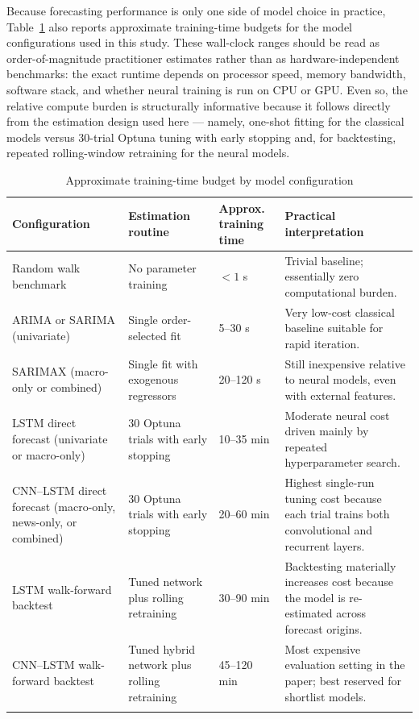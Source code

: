 \documentclass[pdflatex,sn-mathphys-num]{sn-jnl}%
\theoremstyle{thmstyleone}%
\theoremstyle{thmstyletwo}%
\theoremstyle{thmstylethree}%
\begin{document}
Because forecasting performance is only one side of model choice in practice, Table~\ref{tab:compute_budget} also reports approximate training-time budgets for the model configurations used in this study. These wall-clock ranges should be read as order-of-magnitude practitioner estimates rather than as hardware-independent benchmarks: the exact runtime depends on processor speed, memory bandwidth, software stack, and whether neural training is run on CPU or GPU. Even so, the relative compute burden is structurally informative because it follows directly from the estimation design used here --- namely, one-shot fitting for the classical models versus 30-trial Optuna tuning with early stopping and, for backtesting, repeated rolling-window retraining for the neural models.

\begin{table}[h]
\centering
\scriptsize
\caption{Approximate training-time budget by model configuration}
\label{tab:compute_budget}
\begin{tabular}{@{}p{2.8cm}p{2.0cm}p{2.0cm}p{5.6cm}@{}}
\toprule
Configuration & Estimation routine & Approx. training time & Practical interpretation \\
\midrule
Random walk benchmark & No parameter training & $<1$ s & Trivial baseline; essentially zero computational burden. \\
ARIMA or SARIMA (univariate) & Single order-selected fit & 5--30 s & Very low-cost classical baseline suitable for rapid iteration. \\
SARIMAX (macro-only or combined) & Single fit with exogenous regressors & 20--120 s & Still inexpensive relative to neural models, even with external features. \\
LSTM direct forecast (univariate or macro-only) & 30 Optuna trials with early stopping & 10--35 min & Moderate neural cost driven mainly by repeated hyperparameter search. \\
CNN--LSTM direct forecast (macro-only, news-only, or combined) & 30 Optuna trials with early stopping & 20--60 min & Highest single-run tuning cost because each trial trains both convolutional and recurrent layers. \\
LSTM walk-forward backtest & Tuned network plus rolling retraining & 30--90 min & Backtesting materially increases cost because the model is re-estimated across forecast origins. \\
CNN--LSTM walk-forward backtest & Tuned hybrid network plus rolling retraining & 45--120 min & Most expensive evaluation setting in the paper; best reserved for shortlist models. \\
\botrule
\end{tabular}
\end{table}
\end{document}
